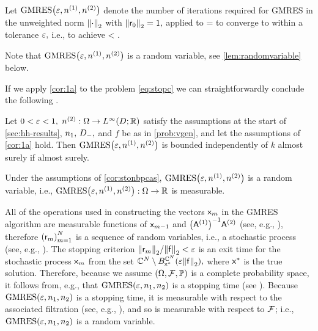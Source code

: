 \

\noindent Let $\GMRES{\eps}{\nso}{\nst}$ denote the number of iterations required for GMRES in the unweighted norm $\Nt{\cdot}$ with $\Nt{\rvecz} = 1,$ applied to
\beqs
\AmatoI\Amatt  \uvec = \AmatoI \fvec
\eeqs
to converge to within a tolerance $\varepsilon,$ i.e., to achieve
\beqs
\frac{\Nt{\rvecm}}{\Nt{\fvec}} < \eps.
\eeqs
\ede

Note that $\GMRES{\eps}{\nso}{\nst}$ is a random variable, see \cref{lem:randomvariable} below.

If we apply \cref{cor:1a} to the problem \cref{eq:stopc} we can straightforwardly conclude the following .

\label{cor:stonbpcas}
Let $0 < \varepsilon < 1,$ $\nst:\Omega \rightarrow \LiDRR$ satisfy the assumptions at the start of \cref{sec:hh-results}, $n_{1}, \,D_{-},$ and $f$ be as in \cref{prob:vgen}, and let the assumptions of \cref{cor:1a} hold. Then $\GMRES{\eps}{\nso}{\nst}$ is bounded independently of $k$ almost surely if
\beq\label{eq:nbpcas}
\NLiDRR{\nso-\nst(\omega)} \leq {}
\eeq
almost surely.
\eco


\label{lem:randomvariable}
Under the assumptions of \cref{cor:stonbpcas}, $\GMRES{\eps}{\nso}{\nst}$ is a random variable, i.e., $\GMRES{\eps}{\nso}{\nst}:\Omega\rightarrow \RR$ is measurable.
\ele

All of the operations used in constructing the vectors $\mathsf{x}_{m}$ in the GMRES algorithm are measurable functions of $\mathsf{x}_{m-1}$ and $\AmatoI\Amatt$ (see, e.g., \cite[Algorithms 11.4.2 and 5.1.3]{GoVa:13}), therefore $\mleft(\rvecm\mright)_{m=1}^N$ is a sequence of random variables, i.e., a stochastic process (see, e.g., \cite[Definition 2.1.4]{Ok:13}). The stopping criterion $\Nt{\rvecm}/\Nt{\fvec} < \eps$ is an exit time for the stochastic process $\mathsf{x}_{m}$ from the set $\CCN \setminus \ball{\CCN}{\xvecs}{\eps\Nt{\fvec}},$ where $\mathsf{x}^{*}$ is the true solution. Therefore, because we assume $\OFP$ is a complete probability space, it follows from, e.g.,  \cite[Example 7.2.2]{Ok:13} that $\GMRES{\eps}{\no}{\nt}$ is a stopping time (see \cite[Definition 7.2.1]{Ok:13}). Because $\GMRES{\eps}{\no}{\nt}$ is a stopping time, it is measurable with respect to the associated filtration (see, e.g., \cite[Definition 3.2.2]{Ok:13}), and so is measurable with respect to $\mathcal F$; i.e., $\GMRES{\eps}{\no}{\nt}$ is a random variable.
\epf

